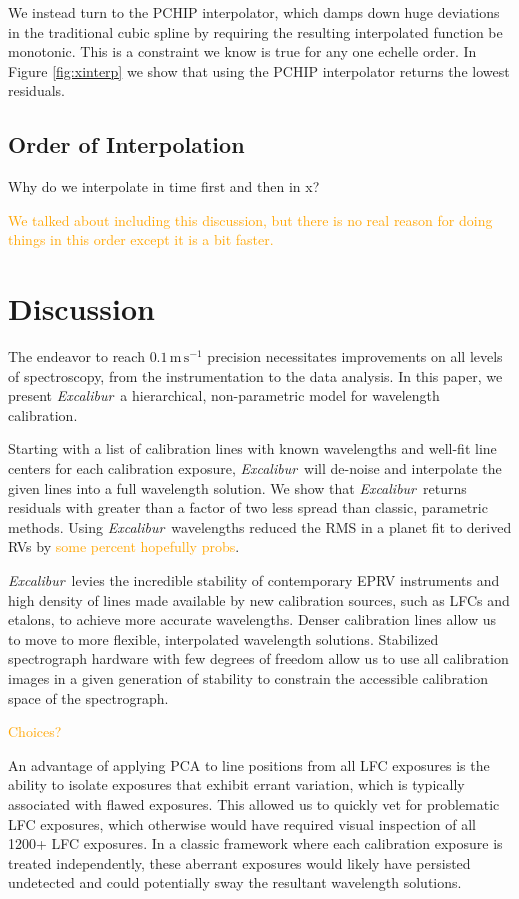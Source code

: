 \documentclass[twocolumn]{aastex63}
\newcommand{\lz}[1]{\textcolor{orange}{#1}}
\newcommand{\project}[1]{\textsl{#1}}
\newcommand{\name}{\project{Excalibur}}
\newcommand{\mps}{\mathrm{m\,s^{-1}}}
\begin{document}
We instead turn to the PCHIP interpolator, which damps down huge deviations in the traditional cubic spline by requiring the resulting interpolated function be monotonic.  This is a constraint we know is true for any one echelle order.  In Figure \ref{fig:xinterp} we show that using the PCHIP interpolator returns the lowest residuals.

\subsection{Order of Interpolation}
Why do we interpolate in time first and then in x?

\lz{We talked about including this discussion, but there is no real reason for doing things in this order except it is a bit faster.}


\section{Discussion} \label{sec:discussion}
The endeavor to reach $0.1\,\mps$ precision necessitates improvements on all levels of spectroscopy, from the instrumentation to the data analysis.  In this paper, we present \name\, a hierarchical, non-parametric model for wavelength calibration.  

Starting with a list of calibration lines with known wavelengths and well-fit line centers for each calibration exposure, \name\ will de-noise and interpolate the given lines into a full wavelength solution.  We show that \name\ returns residuals with greater than a factor of two less spread than classic, parametric methods.  Using \name\ wavelengths reduced the RMS in a planet fit to derived RVs by \lz{some percent hopefully probs}.

\name\ levies the incredible stability of contemporary EPRV instruments and high density of lines made available by new calibration sources, such as LFCs and etalons, to achieve more accurate wavelengths.  Denser calibration lines allow us to move to more flexible, interpolated wavelength solutions.  Stabilized spectrograph hardware with few degrees of freedom allow us to use all calibration images in a given generation of stability to constrain the accessible calibration space of the spectrograph.

\lz{Choices?}

An advantage of applying PCA to line positions from all LFC exposures is the ability to isolate exposures that exhibit errant variation, which is typically associated with flawed exposures.  This allowed us to quickly vet for problematic LFC exposures, which otherwise would have required visual inspection of all 1200+ LFC exposures.  In a classic framework where each calibration exposure is treated independently, these aberrant exposures would likely have persisted undetected and could potentially sway the resultant wavelength solutions.
\end{document}
